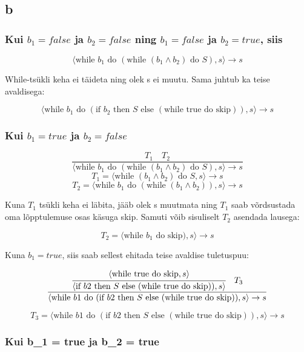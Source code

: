 \subsection{b}

\subsubsection{ Kui \(b_1 = false\) ja \(b_2 = false\) ning \(b_1 = false\) ja \(b_2 = true\), siis}

\[
    \langle
    \text{while } b_1 \text{ do } (\text{while } (b_1 \wedge b_2) \text{ do } S), s
    \rangle \rightarrow s
\]

While-tsükli keha ei täideta ning olek s ei muutu. Sama juhtub ka teise avaldisega:

\[
    \langle
    \text{while } b_1 \text{ do } (\text{if } b_2 \text{ then } S \text{ else }
    (\text{while true do skip})) , s
    \rangle \rightarrow s
\]


\subsubsection{Kui \(b_1 = true\) ja \(b_2 = false\)}

\[
  \frac{
    T_1
    \quad
    T_2
  }{
    \langle
    \text{while } b_1 \text{ do } (\text{while } (b_1 \wedge b_2) \text{ do } S), s
    \rangle \rightarrow s 
  }
\] 
\[T_1 = \langle \text{while } (b_1 \wedge b_2) \text{ do } S, s \rangle \rightarrow s\]
\[T_2 = \langle \text{while } b_1 \text{ do } (\text{while } (b_1 \wedge b_2)), s \rangle \rightarrow s\]

Kuna \(T_1\) tsükli keha ei läbita, jääb olek s muutmata ning \(T_1\) saab võrdsustada
oma lõpptulemuse osas käsuga skip. Samuti võib sisuliselt \(T_2\) asendada lausega:

\[T_2 = \langle \text{while } b_1 \text{ do } \text{skip}), s \rangle \rightarrow s\]

Kuna \(b_1 = true\), siis saab sellest ehitada teise avaldise tuletuspuu:


\[
  \frac{
    \cfrac{
      \langle \text{while true do skip}, s \rangle
    }{
      \langle \text{if } b2 \text{ then } S \text{ else } (\text{while true do
      skip}))
      ,s
      \rangle
    }
    \quad
    T_3
  }{
    \langle
    \text{while } b1 \text{ do } (\text{if } b2 \text{ then } S \text{ else }
    (\text{while true do skip}))
    ,s
    \rangle \rightarrow s 
  }
\] 

\[T_3 = 
    \langle
    \text{while } b1 \text{ do } (\text{if } b2 \text{ then } S \text{ else }
    (\text{while true do skip}))
    ,s
    \rangle \rightarrow s 
  \]

\subsubsection{Kui b_1 = true \; ja \; b_2 = true}

